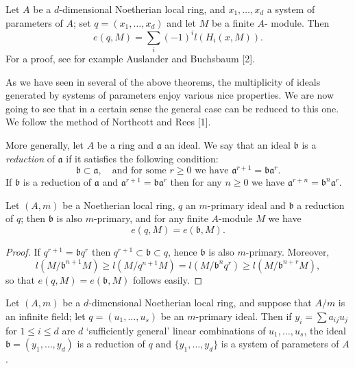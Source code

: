\begin{theorem*}
Let $A$ be a $d$-dimensional Noetherian local ring, and $x_1, \ldots, x_d$ a
system of parameters of $A$; set $q = (x_1, \ldots, x_d)$ and let $M$ be a finite $A$-
module. Then
\[
  e(q, M) = \sum_i (-1)^i l(H_i(x, M)).
\]
For a proof, see for example Auslander and Buchsbaum [2].
\end{theorem*}

As we have seen in several of the above theorems, the multiplicity of
ideals generated by systems of parameters enjoy various nice properties. We
are now going to see that in a certain sense the general case can be reduced
to this one. We follow the method of Northcott and Rees [1].

More generally, let $A$ be a ring and $\mathfrak{a}$ an ideal. We say that an ideal $\mathfrak{b}$ is a
\emph{reduction} of $\mathfrak{a}$ if it satisfies the following condition:
\[
  \mathfrak{b} \subset \mathfrak{a}, \quad \text{and for some } r \ge 0 \text{ we have } \mathfrak{a}^{r+1} = \mathfrak{b}\mathfrak{a}^r.
\]
If $\mathfrak{b}$ is a reduction of $\mathfrak{a}$ and $\mathfrak{a}^{r+1} = \mathfrak{b}\mathfrak{a}^r$ then for any $n \ge 0$ we have $\mathfrak{a}^{r+n} = \mathfrak{b}^n\mathfrak{a}^r$.

\begin{theorem}\label{thm:14.13}
Let $(A, m)$ be a Noetherian local ring, $q$ an $m$-primary ideal
and $\mathfrak{b}$ a reduction of $q$; then $\mathfrak{b}$ is also $m$-primary, and for any finite $A$-module
$M$ we have
\[
  e(q, M) = e(\mathfrak{b}, M).
\]
\end{theorem}

\begin{proof}
If $q^{r+1} = \mathfrak{b}q^r$ then $q^{r+1} \subset \mathfrak{b} \subset q$, hence $\mathfrak{b}$ is also $m$-primary.
Moreover,
\[
  l(M/\mathfrak{b}^{n+1}M) \ge l(M/q^{n+1}M) = l(M/\mathfrak{b}^nq^r) \ge l(M/\mathfrak{b}^{n+r}M),
\]
so that $e(q, M) = e(\mathfrak{b}, M)$ follows easily.
\end{proof}

\begin{theorem}\label{thm:14.14}
Let $(A, m)$ be a $d$-dimensional Noetherian local ring, and
suppose that $A/m$ is an infinite field; let $q = (u_1, \ldots, u_s)$ be an $m$-primary
ideal. Then if $y_i = \sum a_{ij}u_j$ for $1 \le i \le d$ are $d$ `sufficiently general' linear
combinations of $u_1, \ldots, u_s$, the ideal $\mathfrak{b} = (y_1, \ldots, y_d)$ is a reduction of $q$ and
$\{y_1, \ldots, y_d\}$ is a system of parameters of $A$.
\end{theorem}

